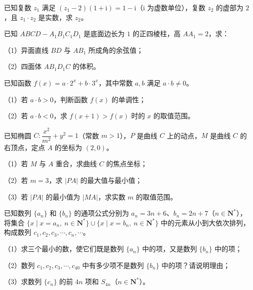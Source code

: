 \begin{question}
已知复数 $z_1$ 满足 $(z_1-2)(1+\mathrm i)=1-\mathrm i$（$\mathrm i$ 为虚数单位），复数 $z_2$ 的虚部为 $2$，且 $z_1\cdot z_2$ 是实数，求 $z_2$。

\Needspace{0.4\textheight}
\end{question}
\begingroup
\renewenvironment{question}{\Needspace{0.4\textheight}}{}
\begin{question}
已知 $ABCD-A_1B_1C_1D_1$ 是底面边长为 $1$ 的正四棱柱，高 $AA_1=2$，求：

（1）异面直线 $BD$ 与 $AB_1$ 所成角的余弦值；

（2）四面体 $AB_1D_1C$ 的体积。
\nopagebreak[4]
\begin{center}\end{center}
\nopagebreak[4]
\end{question}
\endgroup
\begin{question}
已知函数 $f(x)=a\cdot 2^x+b\cdot 3^x$，其中常数 $a,b$ 满足 $a\cdot b\neq 0$。

（1）若 $a\cdot b>0$，判断函数 $f(x)$ 的单调性；

（2）若 $a\cdot b<0$，求 $f(x+1)>f(x)$ 时的 $x$ 的取值范围。

\end{question}
\begin{question}
已知椭圆 $C:\dfrac{x^2}{m^2}+y^2=1$（常数 $m>1$），$P$ 是曲线 $C$ 上的动点，$M$ 是曲线 $C$ 的右顶点，定点 $A$ 的坐标为 $(2,0)$。

（1）若 $M$ 与 $A$ 重合，求曲线 $C$ 的焦点坐标；

（2）若 $m=3$，求 $|PA|$ 的最大值与最小值；

（3）若 $|PA|$ 的最小值为 $|MA|$，求实数 $m$ 的取值范围。

\end{question}
\begin{question}
已知数列 $\{a_n\}$ 和 $\{b_n\}$ 的通项公式分别为 $a_n=3n+6$、$b_n=2n+7$（$n\in\mathbf N^*$），将集合 $\{x\mid x=a_n,\ n\in\mathbf N^*\}\cup\{x\mid x=b_n,\ n\in\mathbf N^*\}$ 中的元素从小到大依次排列，构成数列 $c_1,c_2,c_3,\cdots,c_n,\cdots$。

（1）求三个最小的数，使它们既是数列 $\{a_n\}$ 中的项，又是数列 $\{b_n\}$ 中的项；

（2）数列 $c_1,c_2,c_3,\cdots,c_{40}$ 中有多少项不是数列 $\{b_n\}$ 中的项？请说明理由；

（3）求数列 $\{c_n\}$ 的前 $4n$ 项和 $S_{4n}$（$n\in\mathbf N^*$）。

\end{question}